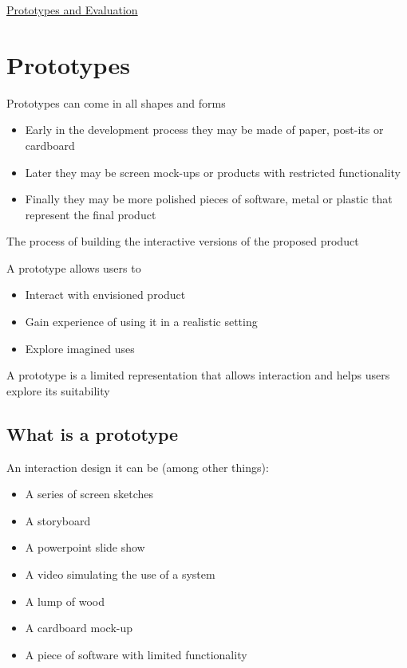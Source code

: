 \documentclass{article}[18pt]
\begin{document}
\begin{center}
\underline{\huge Prototypes and Evaluation}
\end{center}
\section{Prototypes}
Prototypes can come in all shapes and forms
\begin{itemize}
	\item Early in the development process they may be made of paper, post-its or cardboard
	\item Later they may be screen mock-ups or products with restricted functionality
	\item Finally they may be more polished pieces of software, metal or plastic that represent the final product
\end{itemize}
\begin{defin}[Prototyping]
The process of building the interactive versions of the proposed product
\end{defin}
A prototype allows users to
\begin{itemize}
	\item Interact with envisioned product
	\item Gain experience of using it in a realistic setting
	\item Explore imagined uses
\end{itemize}
A prototype is a limited representation that allows interaction and helps users explore its suitability
\subsection{What is a prototype}
An interaction design it can be (among other things):
\begin{itemize}
	\item A series of screen sketches
	\item A storyboard
	\item A powerpoint slide show
	\item A video simulating the use of a system
	\item A lump of wood
	\item A cardboard mock-up
	\item A piece of software with limited functionality
\end{itemize}
\end{document}
